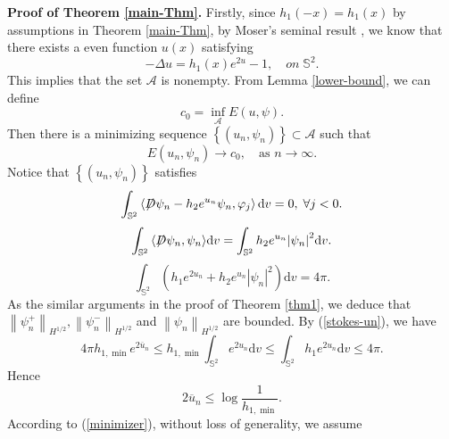 \documentclass[a4paper, 12pt]{article}
\def\slashiii#1{\setbox0=\hbox{$#1$}#1\hskip-\wd0\hbox to\wd0{\hss\sl/\/\hss}}
\begin{document}
\noindent\textbf{Proof of Theorem \ref{main-Thm}. }Firstly, since $h_1(-x)=h_1(x)$ by assumptions in Theorem \ref{main-Thm}, by Moser's seminal result \cite{MR339258}, we know that there exists a even function $u(x)$ satisfying
\[ - \Delta u = h_1(x){e^{2u}} - 1,\quad on\;{\mathbb{S}^2}.\]
This implies that the set \({\mathcal{A}} \) is nonempty. From Lemma \ref{lower-bound}, we can define
\begin{equation*}
	c_0 = \mathop {\inf }\limits_{\mathcal{A}} E\left( {u,\psi } \right).
\end{equation*}Then  there is a minimizing sequence $\left\{ {\left( {{u_n},{\psi _n}} \right)} \right\} \subset \mathcal{A} $ such that
\begin{equation}\label{minimizer}
	E\left( {{u_n},{\psi _n}} \right) \to c_0, ~~~ \text{ as } n \to  \infty.
\end{equation}
Notice that  $\left\{ {\left( {{u_n},{\psi _n}} \right)} \right\} $ satisfies
\begin{equation*}
	\int_{{\mathbb{S}^2}} {\left\langle {\slashiii{D}{\psi _n} -{h_2} { e^{{u_n}}}{\psi _n},{\varphi _j}} \right\rangle {\text{d}{v}} = 0} ,\;\forall j < 0.
\end{equation*}
\begin{equation*}
	\int_{{\mathbb{S}^2}} {\left\langle {\slashiii{D}{\psi _n},{\psi _n}} \right\rangle } {\text{d}{v}} = \int_{{\mathbb{S}^2}}{h_2} {{e^{{u_n}}}} {\left| {{\psi _n}} \right|^2}{\text{d}{v}}.
\end{equation*}
\begin{equation}\label{stokes-un}
	\int_{{\mathbb{S}^2}} {\left( {h_1{e^{2{u_n}}} + {h_2}{e^{{u_n}}}{{\left| {{\psi _n}} \right|}^2}} \right)} {\text{d}{v}} = 4\pi .
\end{equation}	
As the similar arguments in the proof of Theorem \ref{thm1}, we deduce that $\left\| \psi^+_n  \right\|_{H^{1/2}},\left\| \psi^-_n  \right\|_{H^{1/2}}$ and $\left\| \psi_n  \right\|_{H^{1/2}}$ are bounded. By (\ref{stokes-un}), we have \begin{equation*}4\pi {h_{1,\min}}{e^{2{{\overline u }_n}}} \leq {h_{1,\min}}\int_{{\mathbb{S}^2}} {{e^{2{u_n}}}{\text{d}{v}}}  \leq \int_{{\mathbb{S}^2}} {{h_1}{e^{2{u_n}}}{\text{d}{v}}}  \leq 4\pi. \end{equation*}
Hence
\begin{equation}\label{upbound}
	2{\overline u _n} \leq \log \frac{1}{{{h_{1,\min}}}}.
\end{equation} %
According to (\ref{minimizer}), without loss of generality, we assume
\end{document}
